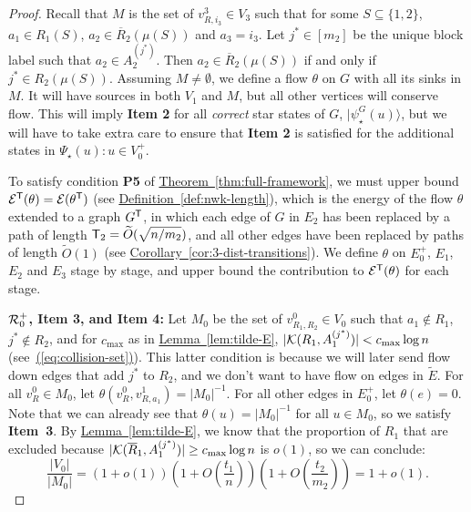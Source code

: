 \documentclass{theoretics}
\newcommand{\eq}[1]{\hyperref[eq:#1]{(\ref*{eq:#1})}}
\newcommand{\thm}[1]{\hyperref[thm:#1]{Theorem~\ref*{thm:#1}}}
\newcommand{\lem}[1]{\hyperref[lem:#1]{Lemma~\ref*{lem:#1}}}
\newcommand{\cor}[1]{\hyperref[cor:#1]{Corollary~\ref*{cor:#1}}}
\newcommand{\defin}[1]{\hyperref[def:#1]{Definition~\ref*{def:#1}}}
\def\ket#1{{\lvert}#1\rangle}
\renewcommand{\>}{\rangle}
\newcommand{\<}{\langle}
\renewcommand{\(}{\left(}
\renewcommand{\)}{\right)}
\begin{document}
\begin{proof}
Recall that $M$ is the set of $v^3_{R,i_3}\in V_3$ such that for some $S\subseteq \{1,2\}$, 
$a_1\in R_1(S)$, $a_2\in \overline{R}_2(\mu(S))$ and $a_3=i_3$. Let $j^*\in [m_2]$ be the unique block label such that $a_2\in A_2^{(j^*)}$. Then $a_2\in \overline{R}_2(\mu(S))$ if and only if $j^*\in R_2(\mu(S))$. 
Assuming $M\neq\emptyset$, we define a flow $\theta$ on $G$ with all its sinks in $M$. It will have sources in both $V_1$ and $M$, but all other vertices will conserve flow. This will imply \textbf{Item 2} for all \emph{correct} star states of $G$, $\ket{\psi_\star^G(u)}$, but we will have to take extra care to ensure that \textbf{Item 2} is satisfied for the additional states in $\Psi_\star(u):u\in V_0^+$. 

To satisfy condition \textbf{P5} of \thm{full-framework}, we must upper bound ${\cal E}^{\sf T}(\theta)={\cal E}(\theta^{\sf T})$ (see \defin{nwk-length}), which is the energy of the flow $\theta$ extended to a graph $G^{\sf T}$, in which each edge of $G$ in $E_2$ has been replaced by a path of length ${\sf T}_2=\widetilde{O}(\sqrt{n/m_2})$, and all other edges have been replaced by paths of length $\widetilde{O}(1)$ (see \cor{3-dist-transitions}).
We define $\theta$ on $E_0^+$, $E_1$, $E_2$ and $E_3$ stage by stage, and upper bound the contribution to ${\cal E}^{\sf T}(\theta)$ for each stage.

\vskip7pt
\noindent\textbf{${\cal R}_0^+$, Item 3, and Item 4:} Let $M_0$ be the set of $v^0_{R_1,R_2}\in V_0$ such that $a_1\not\in R_1$, $j^*\not\in R_2$, and for $c_{\max}$ as in \lem{tilde-E}, $|{\cal K}({R}_1,A_1^{(j^*)})|<c_{\max}\log n$ (see~\eq{collision-set}). This latter condition is because we will later send flow down edges that add $j^*$ to $R_2$, and we don't want to have flow on edges in $\tilde{E}$. For all $v^0_{R}\in M_0$, let $\theta(v^0_{R},v^1_{R,a_1})={|M_0|}^{-1}$. For all other edges in $E_0^+$, let $\theta(e)=0$. Note that we can already see that $\theta(u)={|M_0|}^{-1}$ for all $u\in M_0$, so we satisfy \textbf{Item~3}. By \lem{tilde-E}, we know that the proportion of $R_1$ that are excluded because $|{\cal K}(\overline{R}_1,A_1^{(j^*)})|\geq c_{\max}\log n$ is $o(1)$, so we can conclude:
\begin{equation}
\frac{|V_0|}{|M_0|} = (1+o(1))\left(1+O\left(\frac{t_1}{n}\right)\right)\left(1+O\left(\frac{t_2}{m_2}\right)\right) = 1+o(1).\label{eq:V0-M0}
\end{equation}


\end{proof}
\end{document}
